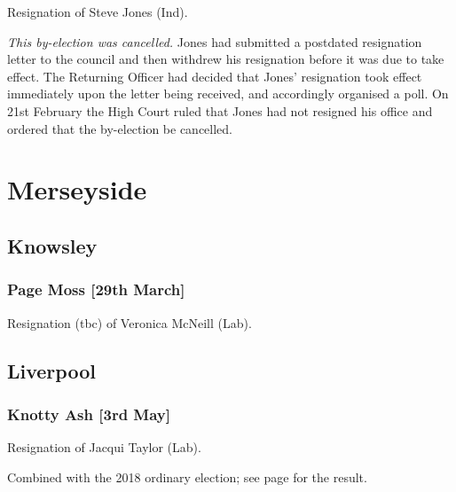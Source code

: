 \documentclass[a4paper,openany]{book}
\begin{document}
\begin{resultsiii}

Resignation of Steve Jones (Ind).

\emph{This by-election was cancelled.}  Jones had submitted a postdated resignation letter to the council and then withdrew his resignation before it was due to take effect.  The Returning Officer had decided that Jones' resignation took effect immediately upon the letter being received, and accordingly organised a poll.  On 21st February the High Court ruled that Jones had not resigned his office and ordered that the by-election be cancelled.

\section{Merseyside}

\subsection*{Knowsley}

\subsubsection*{Page Moss \hspace*{\fill}\nolinebreak[1]%
\enspace\hspace*{\fill}
[29th March]}


Resignation (tbc) of Veronica McNeill (Lab).

\subsection*{Liverpool}

\subsubsection*{Knotty Ash \hspace*{\fill}\nolinebreak[1]%
\enspace\hspace*{\fill}
[3rd May]}


Resignation of Jacqui Taylor (Lab).

Combined with the 2018 ordinary election; see page \pageref{KnottyAshLiverpool} for the result.


\end{resultsiii}
\end{document}
